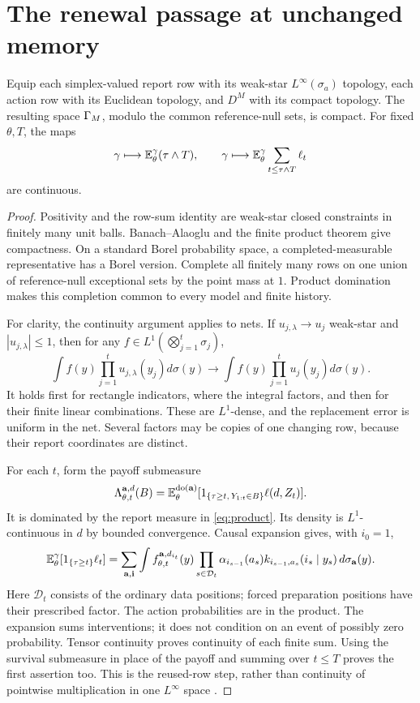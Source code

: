 \section{The renewal passage at unchanged memory}\label{sec:proof}
\begin{lemma}\label{lem:tensor}
Equip each simplex-valued report row with its weak-star $L^\infty(\sigma_a)$ topology, each action row with its Euclidean topology, and $D^M$ with its compact topology. The resulting space $\Gamma_M$, modulo the common reference-null sets, is compact. For fixed $\theta,T$, the maps
\[
 \gamma\longmapsto\mathbb E_\theta^\gamma(\tau\wedge T),\qquad
 \gamma\longmapsto\mathbb E_\theta^\gamma\sum_{t\le\tau\wedge T}\ell_t
\]
are continuous.
\end{lemma}
\begin{proof}
Positivity and the row-sum identity are weak-star closed constraints in finitely many unit balls. Banach--Alaoglu and the finite product theorem give compactness. On a standard Borel probability space, a completed-measurable representative has a Borel version. Complete all finitely many rows on one union of reference-null exceptional sets by the point mass at $1$. Product domination makes this completion common to every model and finite history.

For clarity, the continuity argument applies to nets. If $u_{j,\lambda}\to u_j$ weak-star and $|u_{j,\lambda}|\le1$, then for any $f\in L^1(\bigotimes_{j=1}^t\sigma_j)$,
\[
 \int f(y)\prod_{j=1}^tu_{j,\lambda}(y_j)d\sigma(y)
 \longrightarrow\int f(y)\prod_{j=1}^tu_j(y_j)d\sigma(y).
\]
It holds first for rectangle indicators, where the integral factors, and then for their finite linear combinations. These are $L^1$-dense, and the replacement error is uniform in the net. Several factors may be copies of one changing row, because their report coordinates are distinct.

For each $t$, form the payoff submeasure
\[
 \Lambda_{\theta,t}^{\mathbf a,d}(B)
 =\mathbb E_\theta^{\operatorname{do}(\mathbf a)}
       [1_{\{\tau\ge t,\,Y_{1:t}\in B\}}\ell(d,Z_t)].
\]
It is dominated by the report measure in \eqref{eq:product}. Its density is $L^1$-continuous in $d$ by bounded convergence. Causal expansion gives, with $i_0=1$,
\begin{equation}\label{eq:expansion}
 \mathbb E_\theta^\gamma[1_{\{\tau\ge t\}}\ell_t]
 =\sum_{\mathbf a,\mathbf i}\int
 f_{\theta,t}^{\mathbf a,d_{i_t}}(y)
 \prod_{s\in\mathcal D_t}\alpha_{i_{s-1}}(a_s)
 k_{i_{s-1},a_s}(i_s\mid y_s)\,d\sigma_{\mathbf a}(y).
\end{equation}
Here $\mathcal D_t$ consists of the ordinary data positions; forced preparation positions have their prescribed factor. The action probabilities are in the product. The expansion sums interventions; it does not condition on an event of possibly zero probability. Tensor continuity proves continuity of each finite sum. Using the survival submeasure in place of the payoff and summing over $t\le T$ proves the first assertion too. This is the reused-row step, rather than continuity of pointwise multiplication in one $L^\infty$ space \cite{Discounted}.
\end{proof}

